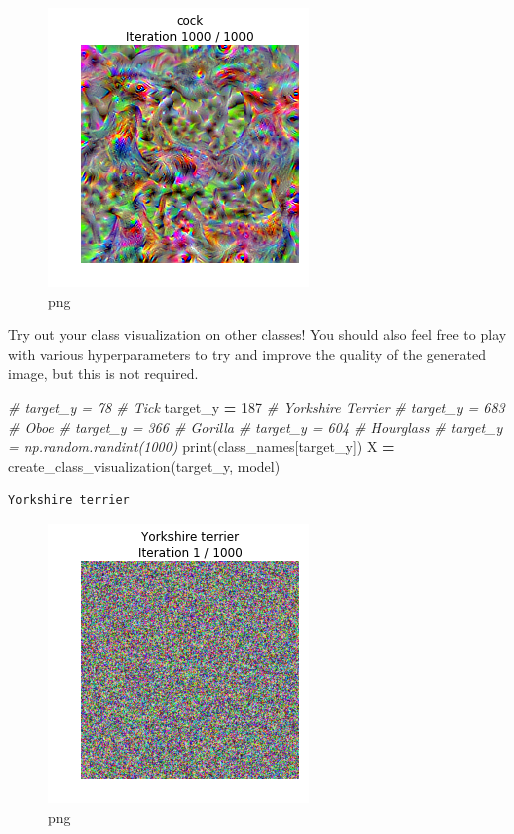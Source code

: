 \documentclass[]{book}
\newenvironment{Shaded}{\begin{snugshade}}{\end{snugshade}}
\newcommand{\DecValTok}[1]{\textcolor[rgb]{0.00,0.00,0.81}{#1}}
\newcommand{\CommentTok}[1]{\textcolor[rgb]{0.56,0.35,0.01}{\textit{#1}}}
\newcommand{\OperatorTok}[1]{\textcolor[rgb]{0.81,0.36,0.00}{\textbf{#1}}}
\newcommand{\BuiltInTok}[1]{#1}
\newcommand{\NormalTok}[1]{#1}
\theoremstyle{definition}
\theoremstyle{definition}
\theoremstyle{definition}
\theoremstyle{remark}
\begin{document}
\begin{figure}
\centering
\includegraphics{Network-Visualization-TensorFlow_files/Network-Visualization-TensorFlow_22_40.png}
\caption{png}
\end{figure}

Try out your class visualization on other classes! You should also feel
free to play with various hyperparameters to try and improve the quality
of the generated image, but this is not required.

\begin{Shaded}
\begin{Highlighting}[]
\CommentTok{# target_y = 78 # Tick}
\NormalTok{target_y }\OperatorTok{=} \DecValTok{187} \CommentTok{# Yorkshire Terrier}
\CommentTok{# target_y = 683 # Oboe}
\CommentTok{# target_y = 366 # Gorilla}
\CommentTok{# target_y = 604 # Hourglass}
\CommentTok{# target_y = np.random.randint(1000)}
\BuiltInTok{print}\NormalTok{(class_names[target_y])}
\NormalTok{X }\OperatorTok{=}\NormalTok{ create_class_visualization(target_y, model)}
\end{Highlighting}
\end{Shaded}

\begin{verbatim}
Yorkshire terrier
\end{verbatim}

\begin{figure}
\centering
\includegraphics{Network-Visualization-TensorFlow_files/Network-Visualization-TensorFlow_24_1.png}
\caption{png}
\end{figure}
\end{document}
